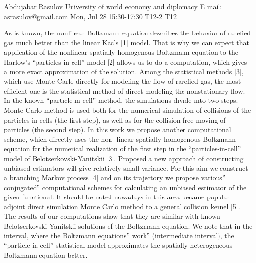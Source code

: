 \begin{talk}
  {Abdujabar Rasulov}%
  {University of world economy and diplomacy}%
  {E mail: asrasulov@gmail.com}%
  {}%
  {}%
  {}%
  {Mon, Jul 28 15:30-17:30}%
  {T12-2}%
  {T12}%
 {}%

				
			
As is known, the nonlinear Boltzmann equation describes the behavior of rareﬁed gas much better than the linear Kac’s [1] model. That is why we can expect that application of the nonlinear spatially homogenous Boltzmann equation to the Harlow’s “particles-in-cell” model [2] allows us to do a computation, which gives a more exact approximation of the solution. 
Among the statistical methods [3], which use Monte Carlo directly for modeling the ﬂow of rareﬁed gas, the most efﬁcient one is the statistical method of direct modeling the nonstationary ﬂow. 
In the known “particle-in-cell” method, the simulations divide into two steps. Monte Carlo method is used both for the numerical simulation of collisions of the particles in cells (the ﬁrst step), as well as for the collision-free moving of particles (the second step). 
In this work we propose another computational scheme, which directly uses the non- linear spatially homogenous Boltzmann equation for the numerical realization of the ﬁrst step in the “particles-in-cell” model of Belotserkovski-Yanitskii [3]. Proposed a new approach of constructing unbiased estimators will give relatively small variance.
 For this aim we construct a branching Markov process [4] and on its trajectory we propose various” conjugated” computational schemes for calculating an unbiased estimator of the given functional. It should be noted nowadays in this area became popular adjoint direct simulation Monte Carlo method to a general collision kernel [5].  
The results of our computations show that they are similar with known Belotserkovski-Yanitskii solutions of the Boltzmann equation. We note that in the interval, where the Boltzmann equations” work” (intermediate interval), the “particle-in-cell” statistical model approximates the spatially heterogeneous Boltzmann equation better. 

\medskip


\end{talk}

